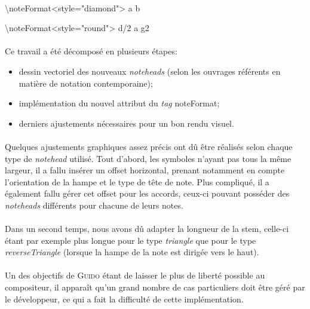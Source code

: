 \documentclass[a4paper,10pt,twocolumn]{article}
\newenvironment{code}
  {\fontfamily{pnc}\selectfont}{}
\begin{document}
\paragraph{}
\begin{code}
\textbackslash{}noteFormat\textless{}style="diamond"\textgreater{} a b

\textbackslash{}noteFormat\textless{}style="round"\textgreater{} d/2 a g2
\end{code}

\paragraph{}
Ce travail a été décomposé en plusieurs étapes:
\begin{itemize}
    \item dessin vectoriel des nouveaux \emph{noteheads} (selon les ouvrages référents en matière de notation contemporaine);
    \item implémentation du nouvel attribut du \emph{tag} \begin{code}noteFormat\end{code};
    \item derniers ajustements nécessaires pour un bon rendu visuel.
\end{itemize}

\paragraph{}
Quelques ajustements graphiques assez précis ont dû être réalisés selon chaque type de \emph{notehead} utilisé. Tout d'abord, les symboles n'ayant pas tous la même largeur, il a fallu insérer un offset horizontal, prenant notamment en compte l'orientation de la hampe et le type de tête de note. Plus compliqué, il a également fallu gérer cet offset pour les accords, ceux-ci pouvant posséder des \emph{noteheads} différents pour chacune de leurs notes.

\paragraph{}
Dans un second temps, nous avons dû adapter la longueur de la stem, celle-ci étant par exemple plus longue pour le type \emph{triangle} que pour le type \emph{reverseTriangle} (lorsque la hampe de la note est dirigée vers le haut).

\paragraph{}
Un des objectifs de \textsc{Guido} étant de laisser le plus de liberté possible au compositeur, il apparaît qu'un grand nombre de cas particuliers doit être géré par le développeur, ce qui a fait la difficulté de cette implémentation.
\end{document}
